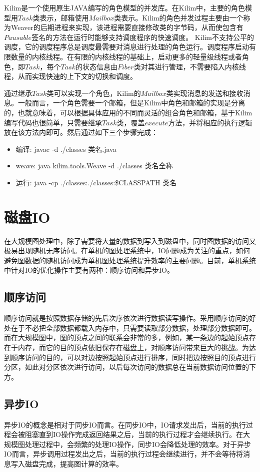 Kilim\cite{srinivasan2008kilim,srinivasan2010kilim,srinivasan2006thread}是一个使用原生JAVA编写的角色模型的并发库。在Kilim中，主要的角色模型用$Task$类表示，邮箱使用$Mailbox$类表示。Kilim的角色并发过程主要由一个称为Weaver的后期进程来实现，该进程需要直接修改类的字节码，从而使包含有$Pausable$签名的方法在运行时能够支持调度程序的快速调度。
Kilim不支持公平的调度，它的调度程序总是调度最需要对消息进行处理的角色运行。调度程序启动有限数量的内核线程。在有限的内核线程的基础上，启动更多的轻量级线程或者角色，即$Task$，每个$Task$的状态信息由$Fiber$类对其进行管理，不需要陷入内核线程，从而实现快速的上下文的切换和调度。

通过继承$Task$类可以实现一个角色，Kilim的$Mailbox$类实现消息的发送和接收消息。一般而言，一个角色需要一个邮箱，但是Kilim中角色和邮箱的实现是分离的，也就意味着，可以根据具体应用的不同而灵活的组合角色和邮箱，基于Kilim编写代码也很简单，只需要继承$Task$类，覆盖$execute$方法，并将相应的执行逻辑放在该方法内即可。然后通过如下三个步骤完成：

\begin{itemize}
\item  编译: javac -d ./classes 类名.java
\item weave:   java kilim.tools.Weave -d ./classes 类名全称
\item 运行:     java -cp ./classes:./classes:\$CLASSPATH  类名
\end{itemize}

\section{磁盘IO}
在大规模图处理中，除了需要将大量的数据到写入到磁盘中，同时图数据的访问又极易出现随机无序访问。在单机的图处理系统中，IO问题成为关注的重点，如何避免图数据的随机访问成为单机图处理系统提升效率的主要问题。目前，单机系统中针对IO的优化操作主要有两种：顺序访问和异步IO。

\subsection{顺序访问}
顺序访问就是按照数据存储的先后次序依次进行数据读写操作。采用顺序访问的好处在于不必把全部数据都载入内存中，只需要读取部分数据，处理部分数据即可。而在大规模图中，图的顶点之间的联系会非常的多，例如，某一条边的起始顶点存在于内存，而它的目的顶点依旧保存在磁盘上，对顺序访问带来巨大的挑战。为达到顺序访问的目的，可以对边按照起始顶点进行排序，同时把边按照目的顶点进行分区，如此对分区依次进行访问，以后每次访问的数据总在当前数据访问位置的下方。
\subsection{异步IO}
异步IO的概念是相对于同步IO而言。在同步IO中，IO请求发出后，当前的执行过程会被阻塞直到IO操作完成返回结果之后，当前的执行过程才会继续执行。在大规模图处理过程中，会频繁的处理IO操作，同步IO会降低处理的效率。对于异步IO而言，异步调用过程发出之后，当前的执行过程会继续进行，并不会等待将消息写入磁盘完成，提高图计算的效率。

